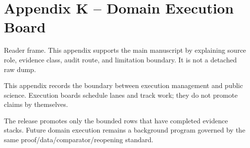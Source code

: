 \section{Appendix K -- Domain Execution Board}
Reader frame. This appendix supports the main manuscript by explaining source role, evidence class, audit route, and limitation boundary. It is not a detached raw dump.


\label{sec:oc-core-1-3-domain-execution-board-summary}

This appendix records the boundary between execution management and public science. Execution boards schedule lanes and track work; they do not promote claims by themselves.


The release promotes only the bounded rows that have completed evidence stacks. Future domain execution remains a background program governed by the same proof/data/comparator/reopening standard.
